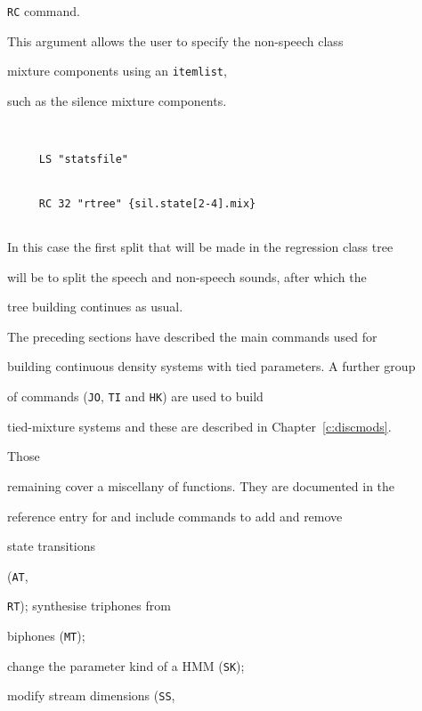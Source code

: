 \texttt{RC} command. 


This argument allows the user to specify the non-speech class


mixture components using an \texttt{itemlist}, 


such as the silence mixture components. 


\begin{verbatim}


     LS "statsfile"


     RC 32 "rtree" {sil.state[2-4].mix}


\end{verbatim}


In this case the first split that will be made in the regression class tree


will be to split the speech and non-speech sounds, after which the


tree building continues as usual. 










The preceding sections have described the main  commands used for


building continuous density systems with tied parameters.  A further group


of commands (\texttt{JO}, \texttt{TI} and \texttt{HK}) are used to build


tied-mixture systems and these are described in Chapter~\ref{c:discmods}.


Those


remaining cover a miscellany of functions.  They are documented in the


reference entry for  and include commands to add and remove


state transitions 


(\texttt{AT},


\texttt{RT}); synthesise triphones from


biphones (\texttt{MT}); 


change the parameter kind of a HMM (\texttt{SK});


modify stream dimensions (\texttt{SS},


